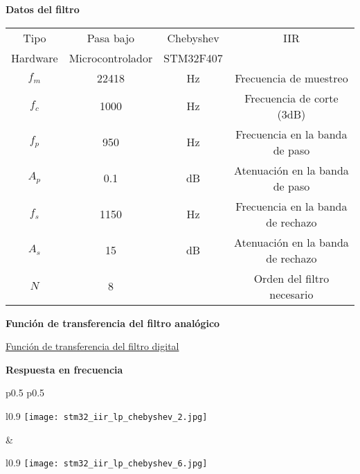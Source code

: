 \documentclass[informe.tex]{subfiles}
\begin{document}
\textbf{Datos del filtro}	\newline	
								
	\begin{tabular}{ |c | c| c| c|}
		\hline
			 Tipo     & Pasa bajo &  Chebyshev &  IIR \\
 			 Hardware & Microcontrolador & STM32F407 & \\		
			$ f_m $  & 22418  & Hz & Frecuencia de muestreo \\
			$ f_c $  & 1000   & Hz & Frecuencia de corte (3dB) \\
			$ f_p $  & 950    & Hz & Frecuencia en la banda de paso\\
			$ A_p $  & 0.1    & dB & Atenuación en la banda de paso \\			
			$ f_s $  & 1150   & Hz & Frecuencia en la banda de rechazo \\
			$ A_s $  & 15     & dB & Atenuación en la banda de rechazo \\
			$ N $   & 8      &  & Orden del filtro necesario \\			
		\hline
	\end{tabular}\newline\newline		
	
\textbf{Función de transferencia del filtro analógico}\newline
	\begin{tiny}
		
	\end{tiny}\newline
    	
    	\underline{Función de transferencia del filtro digital}\newline
	\begin{tiny}
		
	\end{tiny}\newline
	
\textbf{Respuesta en frecuencia}\newline
	\begin{tabular}{p{0.5\textwidth} p{0.5\textwidth}}		
		\begin{wrapfigure}{l}{0.9\linewidth}
    		\centering
    		\texttt{[image: stm32\_iir\_lp\_chebyshev\_2.jpg]}
    		\caption{Filtro analógico}
		\end{wrapfigure}					
		&	
	 	\begin{wrapfigure}{l}{0.9\linewidth}
    		\centering
    		\texttt{[image: stm32\_iir\_lp\_chebyshev\_6.jpg]}
    		\caption{Filtro digital}
		\end{wrapfigure}			
	 	\\ 
	\end{tabular}\newpage
	
\end{document}
